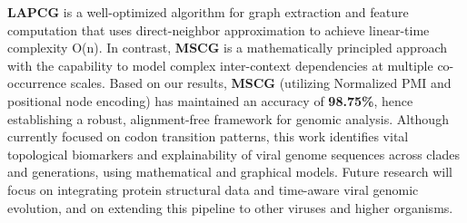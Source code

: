 \documentclass[conference]{IEEEtran}
\begin{document}
\textbf{LAPCG} is a well-optimized algorithm for graph extraction and feature computation that uses direct-neighbor approximation to achieve linear-time complexity O(n). In contrast, \textbf{MSCG} is a mathematically principled approach with the capability to model complex inter-context dependencies at multiple co-occurrence scales. Based on our results, \textbf{MSCG} (utilizing Normalized PMI and positional node encoding) has maintained an accuracy of \textbf{98.75\%}, hence establishing a robust, alignment-free framework for genomic analysis. Although currently focused on codon transition patterns, this work identifies vital topological biomarkers and explainability of viral genome sequences across clades and generations, using mathematical and graphical models. Future research will focus on integrating protein structural data and time-aware viral genomic evolution, and on extending this pipeline to other viruses and higher organisms.



\end{document}
